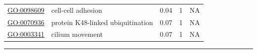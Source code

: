 \documentclass[
]{article}
\begin{document}
\begin{longtable}[]{@{}lllll@{}}
\begin{minipage}[t]{0.17\columnwidth}
\url{GO:0098609}\strut
\end{minipage} & \begin{minipage}[t]{0.17\columnwidth}\raggedright
cell-cell adhesion\strut
\end{minipage} & \begin{minipage}[t]{0.17\columnwidth}\raggedright
0.04\strut
\end{minipage} & \begin{minipage}[t]{0.17\columnwidth}\raggedright
1\strut
\end{minipage} & \begin{minipage}[t]{0.17\columnwidth}\raggedright
NA\strut
\end{minipage}\tabularnewline
\begin{minipage}[t]{0.17\columnwidth}\raggedright
\url{GO:0070936}\strut
\end{minipage} & \begin{minipage}[t]{0.17\columnwidth}\raggedright
protein K48-linked ubiquitination\strut
\end{minipage} & \begin{minipage}[t]{0.17\columnwidth}\raggedright
0.07\strut
\end{minipage} & \begin{minipage}[t]{0.17\columnwidth}\raggedright
1\strut
\end{minipage} & \begin{minipage}[t]{0.17\columnwidth}\raggedright
NA\strut
\end{minipage}\tabularnewline
\begin{minipage}[t]{0.17\columnwidth}\raggedright
\url{GO:0003341}\strut
\end{minipage} & \begin{minipage}[t]{0.17\columnwidth}\raggedright
cilium movement\strut
\end{minipage} & \begin{minipage}[t]{0.17\columnwidth}\raggedright
0.07\strut
\end{minipage} & \begin{minipage}[t]{0.17\columnwidth}\raggedright
1\strut
\end{minipage} & \begin{minipage}[t]{0.17\columnwidth}\raggedright
NA\strut
\end{minipage}\tabularnewline
\bottomrule
\end{longtable}

\begin{center}\rule{0.5\linewidth}{0.5pt}\end{center}
\end{document}
